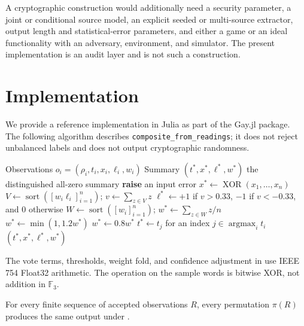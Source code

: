 \documentclass[preprint,nohyperxmp]{iacrtrans}
\begin{document}
A cryptographic construction would additionally need a security parameter, a
joint or conditional source model, an explicit seeded or multi-source
extractor, output length and statistical-error parameters, and either a game
or an ideal functionality with an adversary, environment, and simulator. The
present implementation is an audit layer and is not such a construction.

\section{Implementation}
\label{sec:implementation}

We provide a reference implementation in Julia as part of the Gay.jl package.
The following algorithm describes \texttt{composite\_from\_readings}; it does
not reject unbalanced labels and does not output cryptographic randomness.

\begin{algorithm}
\caption{Deterministic observation summary}
\label{alg:composition}
\begin{algorithmic}[1]
\Require Observations $o_i=(\rho_i,t_i,x_i,\ell_i,w_i)$
\Ensure Summary $(t^*,x^*,\ell^*,w^*)$
    \State \Return the distinguished all-zero summary
\EndIf
{}
        \State \textbf{raise} an input error
    \EndIf
\EndFor
\State $x^* \gets \operatorname{XOR}(x_1,\ldots,x_n)$
\State $V \gets \operatorname{sort}([w_i\ell_i]_{i=1}^n)$; $v \gets \sum_{z\in V}z$
\State $\ell^* \gets +1$ if $v>0.33$, $-1$ if $v<-0.33$, and $0$ otherwise
\State $W \gets \operatorname{sort}([w_i]_{i=1}^n)$; $w^* \gets \sum_{z\in W}z/n$
    \State $w^* \gets \min(1,1.2w^*)$
\Else
    \State $w^* \gets 0.8w^*$
\EndIf
\State $t^* \gets t_j$ for an index $j\in\operatorname{argmax}_i t_i$
\State \Return $(t^*,x^*,\ell^*,w^*)$
\end{algorithmic}
\end{algorithm}

The vote terms, thresholds, weight fold, and confidence adjustment in
 use IEEE 754 Float32 arithmetic. The operation on the
sample words is bitwise XOR, not addition in $\mathbb F_3$.

\begin{proposition}
\label{thm:permutation}
For every finite sequence of accepted observations $R$, every permutation
$\pi(R)$ produces the same output under .
\end{proposition}
\end{document}
